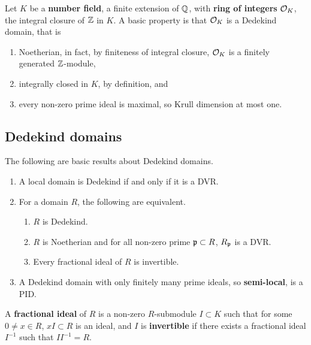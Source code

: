Let $ K $ be a \textbf{number field}, a finite extension of $ \mathbb{Q} $, with \textbf{ring of integers} $ \mathcal{O}_K $, the integral closure of $ \mathbb{Z} $ in $ K $. A basic property is that $ \mathcal{O}_K $ is a Dedekind domain, that is
\begin{enumerate}
\item Noetherian, in fact, by finiteness of integral closure, $ \mathcal{O}_K $ is a finitely generated $ \mathbb{Z} $-module,
\item integrally closed in $ K $, by definition, and
\item every non-zero prime ideal is maximal, so Krull dimension at most one.
\end{enumerate}

\subsection{Dedekind domains}

The following are basic results about Dedekind domains.

\begin{theorem}
\label{thm:2.1}
\hfill
\begin{enumerate}
\item A local domain is Dedekind if and only if it is a DVR.
\item For a domain $ R $, the following are equivalent.
\begin{enumerate}
\item $ R $ is Dedekind.
\item $ R $ is Noetherian and for all non-zero prime $ \mathfrak{p} \subset R $, $ R_{\mathfrak{p}} $ is a DVR.
\item Every fractional ideal of $ R $ is invertible.
\end{enumerate}
\item A Dedekind domain with only finitely many prime ideals, so \textbf{semi-local}, is a PID.
\end{enumerate}
\end{theorem}

A \textbf{fractional ideal} of $ R $ is a non-zero $ R $-submodule $ I \subset K $ such that for some $ 0 \ne x \in R $, $ xI \subset R $ is an ideal, and $ I $ is \textbf{invertible} if there exists a fractional ideal $ I^{-1} $ such that $ II^{-1} = R $.

